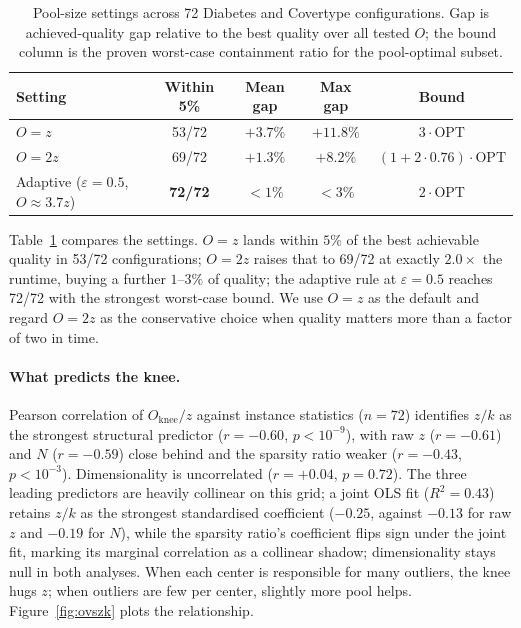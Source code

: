 \documentclass[twoside,leqno,twocolumn]{article}
\newcommand{\OPT}{\mathrm{OPT}}
\begin{document}
\begin{table}[t]
\caption{Pool-size settings across 72 Diabetes and Covertype
configurations. Gap is achieved-quality gap relative to the best
quality over all tested $O$; the bound column is the proven worst-case
containment ratio for the pool-optimal subset.}
\label{tab:osettings}
\centering
\begin{tabular}{lcccc}
\toprule
Setting & Within 5\% & Mean gap & Max gap & Bound \\
\midrule
$O=z$ & 53/72 & $+3.7\%$ & $+11.8\%$ & $3\cdot\OPT$ \\
$O=2z$ & 69/72 & $+1.3\%$ & $+8.2\%$ & $(1+2{\cdot}0.76)\cdot\OPT$ \\
Adaptive ($\varepsilon{=}0.5$, $O{\approx}3.7z$) & \textbf{72/72}
  & ${<}1\%$ & ${<}3\%$ & $2\cdot\OPT$ \\
\bottomrule
\end{tabular}
\end{table}

Table~\ref{tab:osettings} compares the settings. $O=z$ lands within
$5\%$ of the best achievable quality in 53/72 configurations; $O=2z$
raises that to 69/72 at exactly $2.0\times$ the runtime, buying a
further $1$--$3\%$ of quality; the adaptive rule at $\varepsilon=0.5$
reaches 72/72 with the strongest worst-case bound. We use $O=z$ as the
default and regard $O=2z$ as the conservative choice when quality
matters more than a factor of two in time.

\paragraph{What predicts the knee.}
Pearson correlation of $O_{\mathrm{knee}}/z$ against instance
statistics ($n=72$) identifies $z/k$ as the strongest structural
predictor ($r=-0.60$, $p<10^{-9}$), with raw $z$ ($r=-0.61$) and $N$
($r=-0.59$) close behind and the sparsity ratio weaker ($r=-0.43$,
$p<10^{-3}$). Dimensionality is uncorrelated ($r=+0.04$, $p=0.72$).
The three leading predictors are heavily collinear on this grid; a
joint OLS fit ($R^2=0.43$) retains $z/k$ as the strongest
standardised coefficient ($-0.25$, against $-0.13$ for raw $z$ and
$-0.19$ for $N$), while the sparsity ratio's coefficient flips sign
under the joint fit, marking its marginal correlation as a collinear
shadow; dimensionality stays null in both analyses. When each center
is responsible for many outliers, the knee hugs $z$; when outliers are
few per center, slightly more pool helps. Figure~\ref{fig:ovszk} plots
the relationship.
\end{document}
